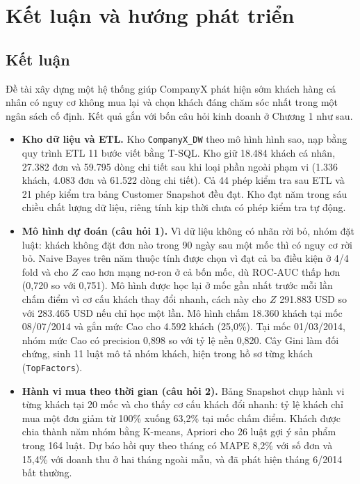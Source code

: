 \section{Kết luận và hướng phát triển}\label{sec:kl}

\subsection{Kết luận}
Đề tài xây dựng một hệ thống giúp CompanyX phát hiện sớm khách hàng cá nhân có nguy cơ không mua lại và chọn khách đáng chăm sóc nhất trong một ngân sách cố định. Kết quả gắn với bốn câu hỏi kinh doanh ở Chương 1 như sau.
\begin{itemize}
    \item \textbf{Kho dữ liệu và ETL.} Kho \texttt{CompanyX\_DW} theo mô hình hình sao, nạp bằng quy trình ETL 11 bước viết bằng T-SQL. Kho giữ 18.484 khách cá nhân, 27.382 đơn và 59.795 dòng chi tiết sau khi loại phần ngoài phạm vi (1.336 khách, 4.083 đơn và 61.522 dòng chi tiết). Cả 44 phép kiểm tra sau ETL và 21 phép kiểm tra bảng Customer Snapshot đều đạt. Kho đạt năm trong sáu chiều chất lượng dữ liệu, riêng tính kịp thời chưa có phép kiểm tra tự động.
    \item \textbf{Mô hình dự đoán (câu hỏi 1).} Vì dữ liệu không có nhãn rời bỏ, nhóm đặt luật: khách không đặt đơn nào trong 90 ngày sau một mốc thì có nguy cơ rời bỏ. Naive Bayes trên năm thuộc tính được chọn vì đạt cả ba điều kiện ở 4/4 fold và cho $Z$ cao hơn mạng nơ-ron ở cả bốn mốc, dù ROC-AUC thấp hơn (0,720 so với 0,751). Mô hình được học lại ở mốc gần nhất trước mỗi lần chấm điểm vì cơ cấu khách thay đổi nhanh, cách này cho $Z$ 291.883 USD so với 283.465 USD nếu chỉ học một lần. Mô hình chấm 18.360 khách tại mốc 08/07/2014 và gắn mức Cao cho 4.592 khách (25,0\%). Tại mốc 01/03/2014, nhóm mức Cao có precision 0,898 so với tỷ lệ nền 0,820. Cây Gini làm đối chứng, sinh 11 luật mô tả nhóm khách, hiện trong hồ sơ từng khách (\texttt{TopFactors}).
    \item \textbf{Hành vi mua theo thời gian (câu hỏi 2).} Bảng Snapshot chụp hành vi từng khách tại 20 mốc và cho thấy cơ cấu khách đổi nhanh: tỷ lệ khách chỉ mua một đơn giảm từ 100\% xuống 63,2\% tại mốc chấm điểm. Khách được chia thành năm nhóm bằng K-means, Apriori cho 26 luật gợi ý sản phẩm trong 164 luật. Dự báo hồi quy theo tháng có MAPE 8,2\% với số đơn và 15,4\% với doanh thu ở hai tháng ngoài mẫu, và đã phát hiện tháng 6/2014 bất thường.

\end{itemize}
